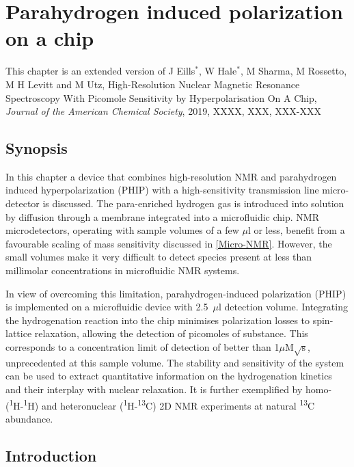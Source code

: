 
\chapter{Parahydrogen induced polarization on a chip} \label{Chapter:Parahydrogen}

 This chapter is an extended version of J Eills$^*$, W Hale$^*$, M Sharma,
 M Rossetto, M H Levitt and M Utz, High-Resolution Nuclear Magnetic Resonance
 Spectroscopy With Picomole Sensitivity by Hyperpolarisation On A Chip,
 \textit{Journal of the American Chemical Society}, 2019, XXXX, XXX, XXX-XXX \citep{Hale2019PHIP}

\section{Synopsis}
In this chapter a device that combines high-resolution NMR and parahydrogen induced hyperpolarization (PHIP)
with a high-sensitivity transmission line micro-detector is discussed.
The para-enriched hydrogen gas is introduced into solution by diffusion
through a membrane integrated into a microfluidic chip.
NMR microdetectors, operating with sample volumes of a few $\mu$l or less,
benefit from a favourable scaling of mass sensitivity discussed
in \ref{Micro-NMR}. However, the small volumes make it very difficult to
detect species present at less
than millimolar concentrations in microfluidic NMR systems.

In view of
overcoming this limitation, parahydrogen-induced polarization
(PHIP) is implemented on a microfluidic device with 2.5~$\mu$l detection volume.
Integrating the hydrogenation reaction into the chip minimises polarization
losses to spin-lattice relaxation, allowing the detection of picomoles of
substance. This corresponds to a concentration limit of detection of better than
1$\mu$M$\sqrt{\text{s}}$, unprecedented at this sample volume.  The
stability and sensitivity of the  system can be used to extract
quantitative information on the hydrogenation kinetics and
their interplay with nuclear relaxation. It is further exemplified by homo-
(\textsuperscript{1}H-\textsuperscript{1}H) and heteronuclear
(\textsuperscript{1}H-\textsuperscript{13}C) 2D NMR experiments
 at natural \textsuperscript{13}C abundance.

 \section{Introduction}

